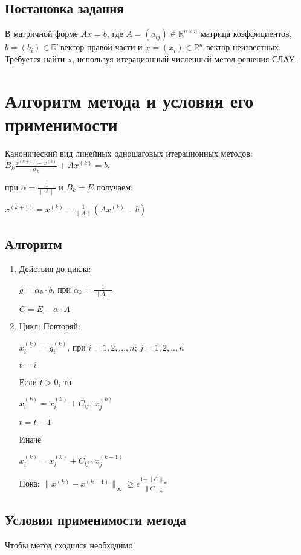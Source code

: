 \documentclass{article}
\begin{document}
	\subsection{Постановка задания}
	В матричной форме $Ax = b$, где $A = (a_{ij}) \in \mathbb{R}^{n\times n} $ матрица коэффициентов, $b = (b_i) \in \mathbb{R}^n $вектор правой части и $x = (x_i) \in \mathbb{R}^n$  вектор неизвестных.
	Требуется найти x, используя итерационный численный метод решения СЛАУ.
	

	\section{Алгоритм метода и условия его применимости}   
	Канонический вид линейных одношаговых итерационных методов:
	$B_k\frac{x^{(k+1)}-x^{(k)}}{\alpha_k} + Ax^{(k)} = b$,
	
	при $\alpha = \frac{1}{\|A\|}$ и $B_k = E$ получаем:
	
	$x^{(k+1)} = x^{(k)} - \frac{1}{\|A\|}(Ax^{(k)} - b)$
	
	\subsection{Алгоритм}
	\begin{enumerate}
		\item Действия до цикла:
		
		$g = \alpha_k \cdot b$, при $\alpha_k = \frac{1}{\|A\|}$ 
		
		$C =  E - \alpha \cdot A$
		
		\item Цикл:
		Повторяй:
		
		
		$x^{(k)}_i = g^{(k)}_i$, при $i = 1, 2,...,n$; $j = 1, 2,..,n$
		
		$t = i$
		
		Если $t > 0$, то
		
			$x^{(k)}_i = x^{(k)}_i + C_{ij} \cdot x^{(k)}_j$
		
			$t = t-1$
		
		Иначе
			
			$x^{(k)}_i = x^{(k)}_i + C_{ij} \cdot x^{(k-1)}_j$
		
		Пока: $\|x^{(k)} - x^{(k-1)}\|_{\infty} \geq \epsilon \frac{1 - \|C\|_{\infty}}{\|C\|_{\infty}}$
		
	\end{enumerate}
	
	\subsection{Условия применимости метода}
	Чтобы метод сходился необходимо:
	
\end{document}
